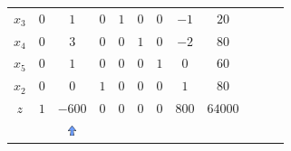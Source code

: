 \begin{frame}
{\begin{table}
\begin{tabular}{c c c c c c c c c c c c}
				\cellcolor{blue!80} \color{red} $ \scriptstyle x_3$
				& \cellcolor{yellow!60}  $ \scriptstyle 0$
				& \cellcolor{gray!60}  $ \scriptstyle 1$ 
				& \cellcolor{yellow!60}  $ \scriptstyle 0$
				& \cellcolor{yellow!60}  $ \scriptstyle 1$
				& \cellcolor{yellow!60}  $ \scriptstyle 0$
				& \cellcolor{yellow!60}  $ \scriptstyle 0$
				& \cellcolor{yellow!60}  $ \scriptstyle -1$ 
				& \cellcolor{yellow!60}  $ \scriptstyle 20$ \\ 
				\cellcolor{blue!80} \color{red} $ \scriptstyle x_4$
				& \cellcolor{yellow!60}  $ \scriptstyle 0$
				& \cellcolor{gray!60}  $ \scriptstyle 3$ 
				& \cellcolor{yellow!60}  $ \scriptstyle 0$
				& \cellcolor{yellow!60}  $ \scriptstyle 0$
				& \cellcolor{yellow!60}  $ \scriptstyle 1$
				& \cellcolor{yellow!60}  $ \scriptstyle 0$
				& \cellcolor{yellow!60}  $ \scriptstyle -2$ 
				& \cellcolor{yellow!60}  $ \scriptstyle 80$ \\ 
				\cellcolor{blue!80} \color{red} $ \scriptstyle x_5$  
				& \cellcolor{yellow!60}  $ \scriptstyle 0$
				& \cellcolor{gray!60}  $ \scriptstyle 1$ 
				& \cellcolor{yellow!60}  $ \scriptstyle 0$
				& \cellcolor{yellow!60}  $ \scriptstyle 0$
				& \cellcolor{yellow!60}  $ \scriptstyle 0$
				& \cellcolor{yellow!60}  $ \scriptstyle 1$
				& \cellcolor{yellow!60}  $ \scriptstyle 0$ 
				& \cellcolor{yellow!60}  $ \scriptstyle 60$ \\
				\cellcolor{blue!80} \color{red} $ \scriptstyle x_2$
				& \cellcolor{yellow!60}  $ \scriptstyle 0$
				& \cellcolor{gray!60}  $ \scriptstyle 0$ 
				& \cellcolor{yellow!60}  $ \scriptstyle 1$
				& \cellcolor{yellow!60}  $ \scriptstyle 0$
				& \cellcolor{yellow!60}  $ \scriptstyle 0$
				& \cellcolor{yellow!60}  $ \scriptstyle 0$
				& \cellcolor{yellow!60}  $ \scriptstyle 1$ 
				& \cellcolor{yellow!60}  $ \scriptstyle 80$ \\
				\cellcolor{blue!80} \color{white} $ \scriptstyle z$
				& \cellcolor{yellow!60}  $ \scriptstyle 1$
				& \cellcolor{gray!60}  $ \scriptstyle -600$ 
				& \cellcolor{yellow!60}  $ \scriptstyle 0$
				& \cellcolor{yellow!60}  $ \scriptstyle 0$
				& \cellcolor{yellow!60}  $ \scriptstyle 0$
				& \cellcolor{yellow!60}  $ \scriptstyle 0$
				& \cellcolor{yellow!60}  $ \scriptstyle 800$ 
				& \cellcolor{yellow!60}  $ \scriptstyle 64000$ \\
				& & \includegraphics[width=0.3cm,height=0.3cm]{setacima.jpg} \\

\end{tabular}
\end{table}}
\end{frame}
